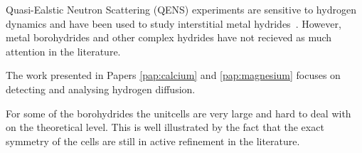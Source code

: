 Quasi-Ealstic Neutron Scattering (QENS) experiments are sensitive to hydrogen dynamics and have been used to study interstitial metal hydrides~\citemiss.
However, metal borohydrides and other complex hydrides have not recieved as much attention in the literature.

The work presented in Papers \ref{pap:calcium} and \ref{pap:magnesium} focuses on detecting and analysing hydrogen diffusion.

For some of the borohydrides the unitcells are very large and hard to deal with on the theoretical level.
This is well illustrated by the fact that the exact symmetry of the cells are still in active refinement in the literature.~\citemiss

\incomplete
